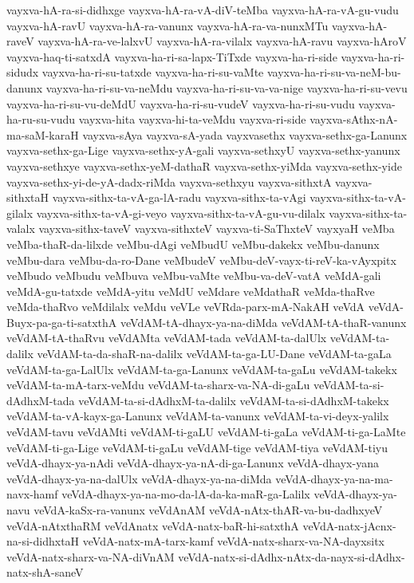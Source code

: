 {vayxva-hA-ra-si-didhxge
vayxva-hA-ra-vA-diV-teMba
vayxva-hA-ra-vA-gu-vudu
vayxva-hA-ravU
vayxva-hA-ra-vanunx
vayxva-hA-ra-va-nunxMTu
vayxva-hA-raveV
vayxva-hA-ra-ve-lalxvU
vayxva-hA-ra-vilalx
vayxva-hA-ravu
vayxva-hAroV
vayxva-haq-ti-satxdA
vayxva-ha-ri-sa-lapx-TiTxde
vayxva-ha-ri-side
vayxva-ha-ri-sidudx
vayxva-ha-ri-su-tatxde
vayxva-ha-ri-su-vaMte
vayxva-ha-ri-su-va-neM-bu-danunx
vayxva-ha-ri-su-va-neMdu
vayxva-ha-ri-su-va-va-nige
vayxva-ha-ri-su-vevu
vayxva-ha-ri-su-vu-deMdU
vayxva-ha-ri-su-vudeV
vayxva-ha-ri-su-vudu
vayxva-ha-ru-su-vudu
vayxva-hita
vayxva-hi-ta-veMdu
vayxva-ri-side
vayxva-sAthx-nA-ma-saM-karaH
vayxva-sAya
vayxva-sA-yada
vayxvasethx
vayxva-sethx-ga-Lanunx
vayxva-sethx-ga-Lige
vayxva-sethx-yA-gali
vayxva-sethxyU
vayxva-sethx-yanunx
vayxva-sethxye
vayxva-sethx-yeM-dathaR
vayxva-sethx-yiMda
vayxva-sethx-yide
vayxva-sethx-yi-de-yA-dadx-riMda
vayxva-sethxyu
vayxva-sithxtA
vayxva-sithxtaH
vayxva-sithx-ta-vA-ga-lA-radu
vayxva-sithx-ta-vAgi
vayxva-sithx-ta-vA-gilalx
vayxva-sithx-ta-vA-gi-veyo
vayxva-sithx-ta-vA-gu-vu-dilalx
vayxva-sithx-ta-valalx
vayxva-sithx-taveV
vayxva-sithxteV
vayxva-ti-SaThxteV
vayxyaH
veMba
veMba-thaR-da-lilxde
veMbu-dAgi
veMbudU
veMbu-dakekx
veMbu-danunx
veMbu-dara
veMbu-da-ro-Dane
veMbudeV
veMbu-deV-vayx-ti-reV-ka-vAyxpitx
veMbudo
veMbudu
veMbuva
veMbu-vaMte
veMbu-va-deV-vatA
veMdA-gali
veMdA-gu-tatxde
veMdA-yitu
veMdU
veMdare
veMdathaR
veMda-thaRve
veMda-thaRvo
veMdilalx
veMdu
veVLe
veVRda-parx-mA-NakAH
veVdA
veVdA-Buyx-pa-ga-ti-satxthA
veVdAM-tA-dhayx-ya-na-diMda
veVdAM-tA-thaR-vanunx
veVdAM-tA-thaRvu
veVdAMta
veVdAM-tada
veVdAM-ta-dalUlx
veVdAM-ta-dalilx
veVdAM-ta-da-shaR-na-dalilx
veVdAM-ta-ga-LU-Dane
veVdAM-ta-gaLa
veVdAM-ta-ga-LalUlx
veVdAM-ta-ga-Lanunx
veVdAM-ta-gaLu
veVdAM-takekx
veVdAM-ta-mA-tarx-veMdu
veVdAM-ta-sharx-va-NA-di-gaLu
veVdAM-ta-si-dAdhxM-tada
veVdAM-ta-si-dAdhxM-ta-dalilx
veVdAM-ta-si-dAdhxM-takekx
veVdAM-ta-vA-kayx-ga-Lanunx
veVdAM-ta-vanunx
veVdAM-ta-vi-deyx-yalilx
veVdAM-tavu
veVdAMti
veVdAM-ti-gaLU
veVdAM-ti-gaLa
veVdAM-ti-ga-LaMte
veVdAM-ti-ga-Lige
veVdAM-ti-gaLu
veVdAM-tige
veVdAM-tiya
veVdAM-tiyu
veVdA-dhayx-ya-nAdi
veVdA-dhayx-ya-nA-di-ga-Lanunx
veVdA-dhayx-yana
veVdA-dhayx-ya-na-dalUlx
veVdA-dhayx-ya-na-diMda
veVdA-dhayx-ya-na-ma-navx-hamf
veVdA-dhayx-ya-na-mo-da-lA-da-ka-maR-ga-Lalilx
veVdA-dhayx-ya-navu
veVdA-kaSx-ra-vanunx
veVdAnAM
veVdA-nAtx-thAR-va-bu-dadhxyeV
veVdA-nAtxthaRM
veVdAnatx
veVdA-natx-baR-hi-satxthA
veVdA-natx-jAcnx-na-si-didhxtaH
veVdA-natx-mA-tarx-kamf
veVdA-natx-sharx-va-NA-dayxsitx
veVdA-natx-sharx-va-NA-diVnAM
veVdA-natx-si-dAdhx-nAtx-da-nayx-si-dAdhx-natx-shA-saneV
}
